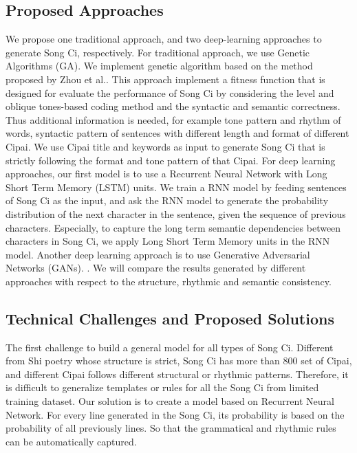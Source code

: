 \subsection{Proposed Approaches}
%
We propose one traditional approach, and two deep-learning approaches to generate Song Ci, respectively.
%
For traditional approach, we use Genetic Algorithms (GA).
%
We implement genetic algorithm based on the method proposed by Zhou et al.\cite{zhou2010genetic}.
%
This approach implement a fitness function that is designed for evaluate the performance of Song Ci by considering the level and oblique tones-based coding method and the syntactic and semantic correctness.
%
Thus additional information is needed, for example tone pattern and rhythm of words, syntactic pattern of sentences with different length and format of different Cipai.
%
We use Cipai title and keywords as input to generate Song Ci that is strictly following the format and tone pattern of that Cipai.
For deep learning approaches, our first model is to use a Recurrent Neural Network  with Long Short Term Memory (LSTM) units.
%
We train a RNN model by feeding sentences of Song Ci as the input, and ask the RNN model to generate the probability distribution of the next character in the sentence, given the sequence of previous characters.
%
Especially, to capture the long term semantic dependencies between characters in Song Ci,
%
we apply Long Short Term Memory units in the RNN model.
Another deep learning approach is to use Generative Adversarial Networks (GANs).
%
.
%
We will compare the results generated by different approaches with respect to the structure, rhythmic and semantic consistency.

\subsection{Technical Challenges and Proposed Solutions}
The first challenge to build a general model for all types of Song Ci.
%
Different from Shi poetry whose structure is strict,  Song Ci has more than 800 set of Cipai, and different Cipai follows different structural or rhythmic patterns.
%
Therefore, it is difficult to generalize templates or rules for all the Song Ci from limited training dataset.
%
Our solution is to create a model based on Recurrent Neural Network. For every line generated in the Song Ci, its probability is based on the probability of all previously lines.
%
So that the grammatical and rhythmic rules can be automatically captured.


